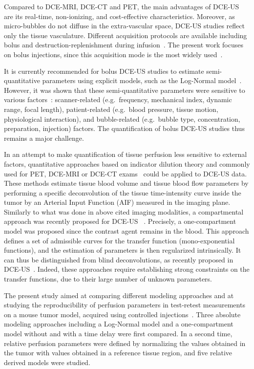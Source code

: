 Compared to DCE-MRI, DCE-CT and PET, the main advantages of DCE-US are its real-time, non-ionizing, and cost-effective characteristics. Moreover, as micro-bubbles do not diffuse in the extra-vascular space, DCE-US studies reflect only the tissue vasculature. 
Different acquisition protocols are available including bolus and destruction-replenishment during infusion~\cite{Wei1998tc}. The present work focuses on bolus injections, since this acquisition mode is the most widely used~\cite{Dietrich2012kw}. 

It is currently recommended for bolus DCE-US studies to estimate semi-quantitative parameters using explicit models, such as the Log-Normal model~\cite{Strouthos2010it}. 
However, it was shown that these semi-quantitative parameters were sensitive to various factors~\cite{Tang2011fj}: scanner-related (e.g.~frequency, mechanical index, dynamic range, focal length), patient-related (e.g.~blood pressure, tissue motion, physiological interaction), and bubble-related (e.g.~bubble type, concentration, preparation, injection) factors. The quantification of bolus DCE-US studies thus remains a major challenge.

In an attempt to make quantification of tissue perfusion less sensitive to external factors, quantitative approaches based on indicator dilution theory and commonly used for PET, DCE-MRI or DCE-CT exams~\cite{Tofts1999ih,Wedam2006bi,OConnor2007ku} could be  applied to DCE-US data.
These methods estimate tissue blood volume and  tissue blood flow parameters by performing a specific deconvolution of the tissue time-intensity curve inside the tumor by an Arterial Input Function (AIF) measured in the imaging plane.  Similarly to  what was done in above cited imaging modalities, a compartmental approach was recently proposed for DCE-US ~\cite{Doury2016tk}. Precisely, a one-compartment model was proposed since the contrast agent remains in the blood. This approach defines a set of admissible curves for the transfer function (mono-exponential functions), and the estimation of parameters is then regularized intrinsically. It can thus be distinguished from blind deconvolutions, as recently proposed in DCE-US~\cite{Gauthier2012vc,Jirik2014hv}. Indeed, these  approaches require establishing strong constraints on the transfer functions, due to their large number of unknown parameters.

The present study aimed at comparing different modeling approaches and at studying the reproducibility of perfusion parameters in test-retest measurements on a mouse tumor model, acquired using controlled injections~\cite{Dizeux2016cd}. Three absolute modeling approaches including a Log-Normal model and a one-compartment model without and with a time delay were first compared. In a second time, relative perfusion parameters were defined by normalizing the values obtained in the tumor with values obtained in a reference tissue region, and five relative derived models were studied. 

